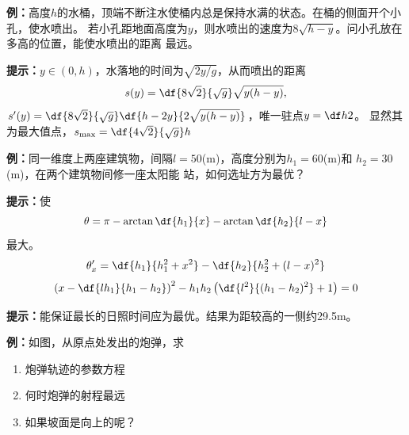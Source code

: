 {\bf 例：}高度$h$的水桶，顶端不断注水使桶内总是保持水满的状态。在桶的侧面开个小孔，使水喷出。
若小孔距地面高度为$y$，则水喷出的速度为$8\sqrt{h-y}$。问小孔放在多高的位置，能使水喷出的距离
最远。

{\bf 提示：}$y\in(0,h)$，水落地的时间为$\sqrt{2y/g}$，从而喷出的距离
$$s(y)=\df{8\sqrt{2}}{\sqrt g}\sqrt{y(h-y)},$$
$s'(y)=\df{8\sqrt{2}}{\sqrt g}\df{h-2y}{2\sqrt{y(h-y)}}$，唯一驻点$y=\df h2$。
显然其为最大值点，$s_{\max}=\df{4\sqrt 2}{\sqrt{g}}h$

{\bf 例：}同一维度上两座建筑物，间隔$l=50$(m)，高度分别为$h_1=60$(m)和
$h_2=30$(m)，在两个建筑物间修一座太阳能
站，如何选址方为最优？

{\bf 提示：}使
$$\theta=\pi-\arctan\df{h_1}{x}-\arctan\df{h_2}{l-x}$$
最大。
$$\theta'_x=\df{h_1}{h_1^2+x^2}-\df{h_2}{h_2^2+(l-x)^2}$$
$$\left(x-\df{lh_1}{h_1-h_2}\right)^2-h_1h_2\left(\df{l^2}
{(h_1-h_2)^2}+1\right)=0$$

{\bf 提示：}能保证最长的日照时间应为最优。结果为距较高的一侧约29.5m。

{\bf 例：}如图，从原点处发出的炮弹，求
\begin{enumerate}[(1)]
  \setlength{\itemindent}{1cm}
  \item 炮弹轨迹的参数方程
  \item 何时炮弹的射程最远
  \item 如果坡面是向上的呢？
\end{enumerate}
\begin{center}
\end{center}

